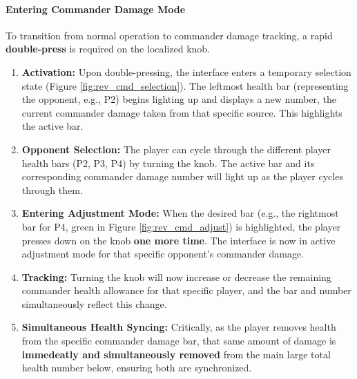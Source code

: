 \documentclass[11pt,a4paper]{article}
\begin{document}
\paragraph{Entering Commander Damage Mode}
To transition from normal operation to commander damage tracking, a rapid \textbf{double-press} is required on the localized knob.

\begin{enumerate}
    \item \textbf{Activation:} Upon double-pressing, the interface enters a temporary selection state (Figure \ref{fig:rev_cmd_selection}). The leftmost health bar (representing the opponent, e.g., P2) begins lighting up and displays a new number, the current commander damage taken from that specific source. This highlights the active bar.

    \item \textbf{Opponent Selection:} The player can cycle through the different player health bars (P2, P3, P4) by turning the knob. The active bar and its corresponding commander damage number will light up as the player cycles through them.

    \item \textbf{Entering Adjustment Mode:} When the desired bar (e.g., the rightmost bar for P4, green in Figure \ref{fig:rev_cmd_adjust}) is highlighted, the player presses down on the knob \textbf{one more time}. The interface is now in active adjustment mode for that specific opponent's commander damage.

    \item \textbf{Tracking:} Turning the knob will now increase or decrease the remaining commander health allowance for that specific player, and the bar and number simultaneously reflect this change.

    \item \textbf{Simultaneous Health Syncing:} Critically, as the player removes health from the specific commander damage bar, that same amount of damage is \textbf{immedeatly and simultaneously removed} from the main large total health number below, ensuring both are synchronized.
\end{enumerate}
\end{document}
